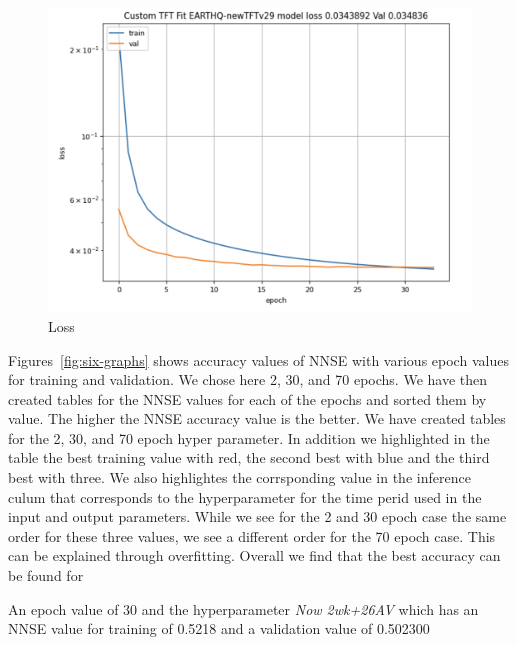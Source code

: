 \documentclass[utf8]{FrontiersinVancouver} %
\newcommand{\TODO}[1]{\todo[inline]{#1}}
\begin{document}
\begin{figure}[htb]
    \centering
    \includegraphics[width=0.70\columnwidth]{images/loss.png}
    \caption{Loss}
    \label{fig:loss}
\end{figure}

Figures~\ref{fig:six-graphs} shows accuracy values of NNSE with
various epoch values for training and validation. We chose here 2, 30,
and 70 epochs.  We have then created tables for the NNSE values for
each of the epochs and sorted them by value. The higher the NNSE
accuracy value is the better. We have created tables for the 2, 30,
and 70 epoch hyper parameter. In addition we highlighted in the table
the best training value with red, the second best with blue and the
third best with three. We also highlightes the corrsponding value in
the inference culum that corresponds to the hyperparameter for the
time perid used in the input and output parameters. While we see for
the 2 and 30 epoch case the same order for these three values, we see
a different order for the 70 epoch case. This can be explained through
overfitting. Overall we find that the best accuracy can be found for

An epoch value of 30  and the hyperparameter {\em Now 2wk+26AV} which has an NNSE value for training of 
0.5218 and a validation value of 0.502300 

\TODO{what is Now 2wk+26AV}
\end{document}
